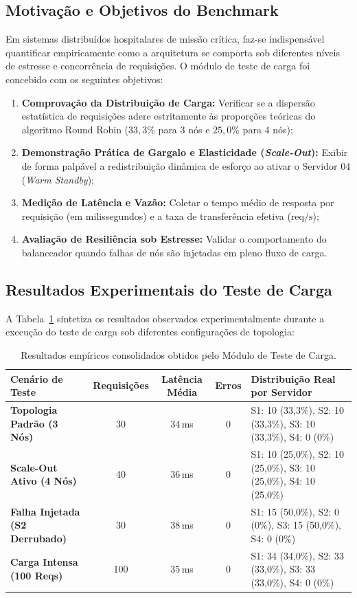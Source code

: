 \documentclass[12pt,a4paper]{article}
\begin{document}
\subsection{Motivação e Objetivos do Benchmark}
Em sistemas distribuídos hospitalares de missão crítica, faz-se indispensável quantificar empiricamente como a arquitetura se comporta sob diferentes níveis de estresse e concorrência de requisições. O módulo de teste de carga foi concebido com os seguintes objetivos:
\begin{enumerate}
	\item \textbf{Comprovação da Distribuição de Carga:} Verificar se a dispersão estatística de requisições adere estritamente às proporções teóricas do algoritmo Round Robin ($33{,}3\%$ para 3 nós e $25{,}0\%$ para 4 nós);
	\item \textbf{Demonstração Prática de Gargalo e Elasticidade (\textit{Scale-Out}):} Exibir de forma palpável a redistribuição dinâmica de esforço ao ativar o Servidor 04 (\textit{Warm Standby});
	\item \textbf{Medição de Latência e Vazão:} Coletar o tempo médio de resposta por requisição (em milissegundos) e a taxa de transferência efetiva ($\text{req/s}$);
	\item \textbf{Avaliação de Resiliência sob Estresse:} Validar o comportamento do balanceador quando falhas de nós são injetadas em pleno fluxo de carga.
\end{enumerate}

\subsection{Resultados Experimentais do Teste de Carga}
A Tabela~\ref{tab:benchmark_resultados} sintetiza os resultados observados experimentalmente durante a execução do teste de carga sob diferentes configurações de topologia:

\begin{table}[H]
	\centering
	\small
	\begin{tabularx}{\textwidth}{l c c c X}
		\toprule
		\textbf{Cenário de Teste} & \textbf{Requisições} & \textbf{Latência Média} & \textbf{Erros} & \textbf{Distribuição Real por Servidor} \\
		\midrule
		\textbf{Topologia Padrão (3 Nós)} & 30 & 34\,ms & 0 & S1: 10 (33{,}3\%), S2: 10 (33{,}3\%), S3: 10 (33{,}3\%), S4: 0 (0\%) \\
		\textbf{Scale-Out Ativo (4 Nós)} & 40 & 36\,ms & 0 & S1: 10 (25{,}0\%), S2: 10 (25{,}0\%), S3: 10 (25{,}0\%), S4: 10 (25{,}0\%) \\
		\textbf{Falha Injetada (S2 Derrubado)} & 30 & 38\,ms & 0 & S1: 15 (50{,}0\%), S2: 0 (0\%), S3: 15 (50{,}0\%), S4: 0 (0\%) \\
		\textbf{Carga Intensa (100 Reqs)} & 100 & 35\,ms & 0 & S1: 34 (34{,}0\%), S2: 33 (33{,}0\%), S3: 33 (33{,}0\%), S4: 0 (0\%) \\
		\bottomrule
	\end{tabularx}
	\caption{Resultados empíricos consolidados obtidos pelo Módulo de Teste de Carga.}
	\label{tab:benchmark_resultados}
\end{table}
\end{document}
